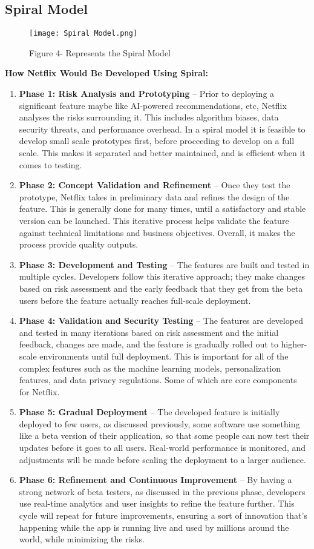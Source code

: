 \documentclass[a4paper,10pt,twoside]{article}
\begin{document}
\subsection{Spiral Model}
\begin{figure}[h]
\centering
\texttt{[image: Spiral Model.png]}
\caption{Figure 4- Represents the Spiral Model}
\label{fig:spiral}
\end{figure}
\pagebreak
\textbf{How Netflix Would Be Developed Using Spiral:}
\begin{enumerate}
    \item \textbf{Phase 1: Risk Analysis and Prototyping} – Prior to deploying a significant feature maybe like AI-powered recommendations, etc, Netflix analyses the risks surrounding it. This includes algorithm biases, data security threats, and performance overhead. In a spiral model it is feasible to develop small scale prototypes first, before proceeding to develop on a full scale. This makes it separated and better maintained, and is efficient when it comes to testing.
    \item \textbf{Phase 2: Concept Validation and Refinement} – Once they test the prototype, Netflix takes in preliminary data and refines the design of the feature. This is generally done for many times, until a satisfactory and stable version can be launched. This iterative process helps validate the feature against technical limitations and business objectives. Overall, it makes the process provide quality outputs.
    \item \textbf{Phase 3: Development and Testing} – The features are built and tested in multiple cycles. Developers follow this iterative approach; they make changes based on risk assessment and the early feedback that they get from the beta users before the feature actually reaches full-scale deployment.
    \item \textbf{Phase 4: Validation and Security Testing} – The features are developed and tested in many iterations based on risk assessment and the initial feedback, changes are made, and the feature is gradually rolled out to higher-scale environments until full deployment. This is important for all of the complex features such as the machine learning models, personalization features, and data privacy regulations. Some of which are core components for Netflix.
    \item \textbf{Phase 5: Gradual Deployment} – The developed feature is initially deployed to few users, as discussed previously, some software use something like a beta version of their application, so that some people can now test their updates before it goes to all users. Real-world performance is monitored, and adjustments will be made before scaling the deployment to a larger audience.
    \item \textbf{Phase 6: Refinement and Continuous Improvement} – By having a strong network of beta testers, as discussed in the previous phase, developers use real-time analytics and user insights to refine the feature further. This cycle will repeat for future improvements, ensuring a sort of innovation that’s happening while the app is running live and used by millions around the world, while minimizing the risks.
\end{enumerate}
\end{document}
